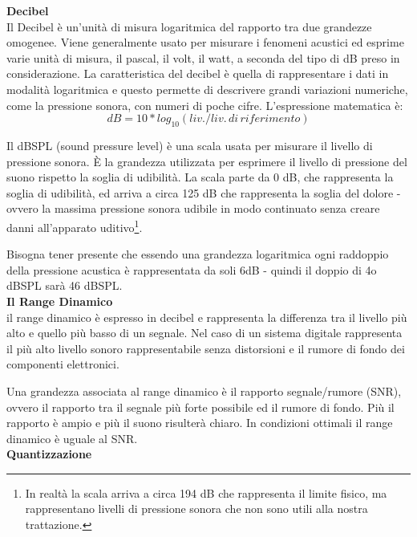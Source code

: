 \documentclass[11pt]{article}
\begin{document}
\begin{multicols*}{2}
\parskip=0pt

\textbf{\textsf {Decibel}}\\

\noindent Il Decibel è un'unità di misura logaritmica del rapporto tra due grandezze omogenee. Viene generalmente usato per misurare i fenomeni acustici ed esprime varie unità di misura, il pascal, il volt, il watt, a seconda del tipo di dB preso in considerazione. La caratteristica del decibel è quella di rappresentare i dati in modalità logaritmica e questo permette di descrivere grandi variazioni numeriche, come la pressione sonora, con numeri  di poche cifre. L'espressione matematica è:
\[
dB = 10 * log_{10}(liv./liv. \, di \, riferimento)
\]

Il dBSPL (sound pressure level) è una scala usata per misurare il livello di pressione sonora. È la grandezza utilizzata per esprimere il livello di pressione del suono rispetto la soglia di udibilità. La scala parte da 0 dB, che rappresenta la soglia di udibilità, ed arriva a circa 125 dB che rappresenta la soglia del dolore - ovvero la massima pressione sonora udibile in modo continuato senza creare danni all'apparato uditivo\footnote{In realtà la scala arriva a circa 194 dB che rappresenta il limite fisico, ma rappresentano livelli di pressione sonora che non sono utili alla nostra trattazione.}.

Bisogna tener presente che essendo una grandezza logaritmica ogni raddoppio della pressione acustica è rappresentata da soli 6dB - quindi il doppio di 4o dBSPL sarà 46 dBSPL.\\

\textbf{\textsf {Il Range Dinamico}}\\

\noindent il range dinamico è espresso in decibel e rappresenta la differenza tra il livello più alto e quello più basso di un segnale. Nel caso di un sistema digitale rappresenta il più alto livello sonoro rappresentabile senza distorsioni e il rumore di fondo dei componenti elettronici. 

Una grandezza associata al range dinamico è il rapporto segnale/rumore (SNR), ovvero il rapporto tra il segnale più forte possibile ed il rumore di fondo. Più il rapporto è ampio e più il suono risulterà chiaro. In condizioni ottimali il range dinamico è uguale al SNR.\\

\textbf{\textsf {Quantizzazione}}\\


\end{multicols*}
\end{document}
